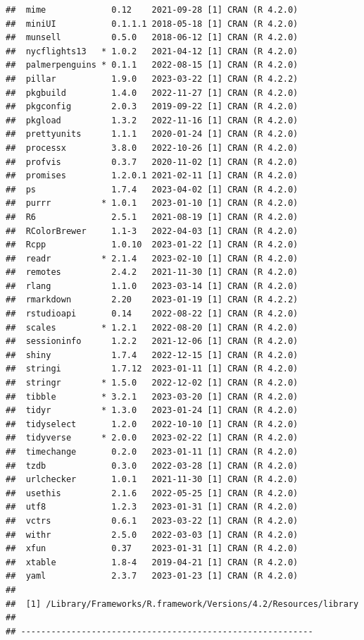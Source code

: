 \documentclass[print]{nuthesis}
\begin{document}
\begin{verbatim}
##  mime             0.12    2021-09-28 [1] CRAN (R 4.2.0)
##  miniUI           0.1.1.1 2018-05-18 [1] CRAN (R 4.2.0)
##  munsell          0.5.0   2018-06-12 [1] CRAN (R 4.2.0)
##  nycflights13   * 1.0.2   2021-04-12 [1] CRAN (R 4.2.0)
##  palmerpenguins * 0.1.1   2022-08-15 [1] CRAN (R 4.2.0)
##  pillar           1.9.0   2023-03-22 [1] CRAN (R 4.2.2)
##  pkgbuild         1.4.0   2022-11-27 [1] CRAN (R 4.2.0)
##  pkgconfig        2.0.3   2019-09-22 [1] CRAN (R 4.2.0)
##  pkgload          1.3.2   2022-11-16 [1] CRAN (R 4.2.0)
##  prettyunits      1.1.1   2020-01-24 [1] CRAN (R 4.2.0)
##  processx         3.8.0   2022-10-26 [1] CRAN (R 4.2.0)
##  profvis          0.3.7   2020-11-02 [1] CRAN (R 4.2.0)
##  promises         1.2.0.1 2021-02-11 [1] CRAN (R 4.2.0)
##  ps               1.7.4   2023-04-02 [1] CRAN (R 4.2.0)
##  purrr          * 1.0.1   2023-01-10 [1] CRAN (R 4.2.0)
##  R6               2.5.1   2021-08-19 [1] CRAN (R 4.2.0)
##  RColorBrewer     1.1-3   2022-04-03 [1] CRAN (R 4.2.0)
##  Rcpp             1.0.10  2023-01-22 [1] CRAN (R 4.2.0)
##  readr          * 2.1.4   2023-02-10 [1] CRAN (R 4.2.0)
##  remotes          2.4.2   2021-11-30 [1] CRAN (R 4.2.0)
##  rlang            1.1.0   2023-03-14 [1] CRAN (R 4.2.0)
##  rmarkdown        2.20    2023-01-19 [1] CRAN (R 4.2.2)
##  rstudioapi       0.14    2022-08-22 [1] CRAN (R 4.2.0)
##  scales         * 1.2.1   2022-08-20 [1] CRAN (R 4.2.0)
##  sessioninfo      1.2.2   2021-12-06 [1] CRAN (R 4.2.0)
##  shiny            1.7.4   2022-12-15 [1] CRAN (R 4.2.0)
##  stringi          1.7.12  2023-01-11 [1] CRAN (R 4.2.0)
##  stringr        * 1.5.0   2022-12-02 [1] CRAN (R 4.2.0)
##  tibble         * 3.2.1   2023-03-20 [1] CRAN (R 4.2.0)
##  tidyr          * 1.3.0   2023-01-24 [1] CRAN (R 4.2.0)
##  tidyselect       1.2.0   2022-10-10 [1] CRAN (R 4.2.0)
##  tidyverse      * 2.0.0   2023-02-22 [1] CRAN (R 4.2.0)
##  timechange       0.2.0   2023-01-11 [1] CRAN (R 4.2.0)
##  tzdb             0.3.0   2022-03-28 [1] CRAN (R 4.2.0)
##  urlchecker       1.0.1   2021-11-30 [1] CRAN (R 4.2.0)
##  usethis          2.1.6   2022-05-25 [1] CRAN (R 4.2.0)
##  utf8             1.2.3   2023-01-31 [1] CRAN (R 4.2.0)
##  vctrs            0.6.1   2023-03-22 [1] CRAN (R 4.2.0)
##  withr            2.5.0   2022-03-03 [1] CRAN (R 4.2.0)
##  xfun             0.37    2023-01-31 [1] CRAN (R 4.2.0)
##  xtable           1.8-4   2019-04-21 [1] CRAN (R 4.2.0)
##  yaml             2.3.7   2023-01-23 [1] CRAN (R 4.2.0)
## 
##  [1] /Library/Frameworks/R.framework/Versions/4.2/Resources/library
## 
## ----------------------------------------------------------
\end{verbatim}
\end{document}
